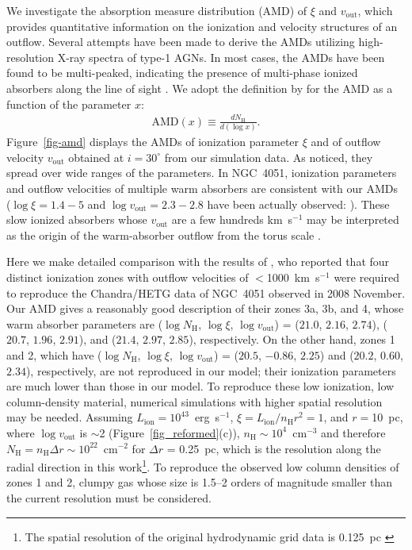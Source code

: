\documentclass[twocolumn,times,twocolappendix]{aastex63}
\begin{document}
We investigate the absorption measure distribution (AMD)
of $\xi$ and $v_\mathrm{out}$, which
provides quantitative information on the ionization and velocity
structures of an outflow.
Several attempts have been made to derive the AMDs
utilizing high-resolution X-ray spectra of type-1 AGNs.
In most cases, the AMDs have been found to be
multi-peaked, indicating the presence of multi-phase ionized
absorbers along the line of sight
\citep[e.g.,][]{Holczer2007,Adhikari2019}.
We adopt the definition by \cite{Holczer2007} for the AMD
as a function of the parameter $x$: 
\begin{eqnarray}
    \mathrm{AMD}\left(x\right) \equiv \frac{dN_\mathrm{H}}{d\left(\log x\right)}.
\end{eqnarray}
Figure~\ref{fig-amd} displays the AMDs of ionization parameter $\xi$
and of outflow velocity $v_\mathrm{out}$ obtained at $i=30^\circ$ from
our simulation data.
As noticed, they spread over wide ranges of the parameters.
In NGC~4051, ionization parameters and outflow velocities 
of multiple warm absorbers are consistent with our AMDs
($\log \xi = 1.4-5$ and $\log v_\mathrm{out} = 2.3-2.8$ have been actually observed:
\citealt{Krongold2007,Steenbrugge2009,Lobban2011,Pounds2011,King2012,Silva2016,Mizumoto2017}).
These slow ionized absorbers whose $v_\mathrm{out}$ are a few hundreds km~s$^{-1}$ may be interpreted as the origin 
of the warm-absorber outflow from the torus scale \citep{Blustin2005}.




Here we make detailed comparison with the results of
\citet{Lobban2011}, who reported that four distinct ionization zones
  with outflow velocities of $<$1000~km~s$^{-1}$
were required to reproduce the Chandra/HETG data of NGC~4051 observed in 2008 November.
Our AMD gives a reasonably good description of
their zones 3a, 3b, and 4, whose warm absorber parameters are 
($\log N_\mathrm{H}$, $\log \xi$, $\log v_\mathrm{out}$) = 
($21.0$, $2.16$,  $2.74$), ($20.7$, $1.96$, $2.91$), and ($21.4$, $2.97$, $2.85$), respectively.
On the other hand, zones 1 and 2,
which have ($\log N_\mathrm{H}$, $\log \xi$, $\log v_\mathrm{out}$) = 
($20.5$, $-0.86$, $2.25$) and ($20.2$, $0.60$, $2.34$), respectively,
are not reproduced in our model; 
their ionization parameters are much lower than those
in our model. To reproduce these low ionization, low column-density
material, numerical simulations with higher spatial resolution may be needed.
Assuming $L_\mathrm{ion} = 10^{43}$~erg~s$^{-1}$, $\xi =
L_\mathrm{ion}/n_\mathrm{H}r^2 = 1$, and $r = $10~pc, where $\log
v_\mathrm{out}$ is $\sim$2 (Figure~\ref{fig_reformed}(c)),
$n_\mathrm{H} \sim 10^4$~cm$^{-3}$ and therefore $N_\mathrm{H} = n_\mathrm{H}
\Delta r \sim 10^{22}$~cm$^{-2}$ for $\Delta r$ = 0.25~pc, 
which is the
resolution along the radial direction in this work\footnote{The
spatial resolution of the original hydrodynamic grid data is
0.125~pc \citep{Wada2016}}. To reproduce the observed low column densities
of zones 1 and 2, clumpy gas whose size is 
1.5--2 orders of magnitude smaller than the current resolution 
must be considered.
\end{document}
